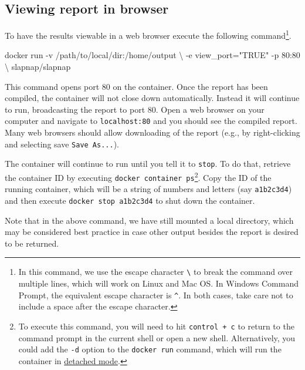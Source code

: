 \documentclass[]{article}
\newenvironment{Shaded}{\begin{snugshade}}{\end{snugshade}}
\newcommand{\StringTok}[1]{\textcolor[rgb]{0.31,0.60,0.02}{#1}}
\newcommand{\ExtensionTok}[1]{#1}
\newcommand{\NormalTok}[1]{#1}
\begin{document}
\subsection{Viewing report in browser}\label{sec:webbrowse}

To have the results viewable in a web browser execute the following
command\footnote{In this command, we use the escape character
  \texttt{\textbackslash{}} to break the command over multiple lines,
  which will work on Linux and Mac OS. In Windows Command Prompt, the
  equivalent escape character is \texttt{\^{}}. In both cases, take care
  not to include a space after the escape character.}.

\begin{Shaded}
\begin{Highlighting}[]
\ExtensionTok{docker}\NormalTok{ run -v /path/to/local/dir:/home/output \textbackslash{}}
\NormalTok{           -e view_port=}\StringTok{"TRUE"}\NormalTok{ -p 80:80 \textbackslash{}}
\NormalTok{           slapnap/slapnap}
\end{Highlighting}
\end{Shaded}

This command opens port 80 on the container. Once the report has been
compiled, the container will not close down automatically. Instead it
will continue to run, broadcasting the report to port 80. Open a web
browser on your computer and navigate to \texttt{localhost:80} and you
should see the compiled report. Many web browsers should allow
downloading of the report (e.g., by right-clicking and selecting save
\texttt{Save\ As...}).

The container will continue to run until you tell it to \texttt{stop}.
To do that, retrieve the container ID by executing
\texttt{docker\ container\ ps}\footnote{To execute this command, you
  will need to hit \texttt{control\ +\ c} to return to the command
  prompt in the current shell or open a new shell. Alternatively, you
  could add the \texttt{-d} option to the \texttt{docker\ run} command,
  which will run the container in
  \href{https://docs.docker.com/engine/reference/run/\#detached-vs-foreground}{detached
  mode}.}. Copy the ID of the running container, which will be a string
of numbers and letters (say \texttt{a1b2c3d4}) and then execute
\texttt{docker\ stop\ a1b2c3d4} to shut down the container.

Note that in the above command, we have still mounted a local directory,
which may be considered best practice in case other output besides the
report is desired to be returned.
\end{document}
